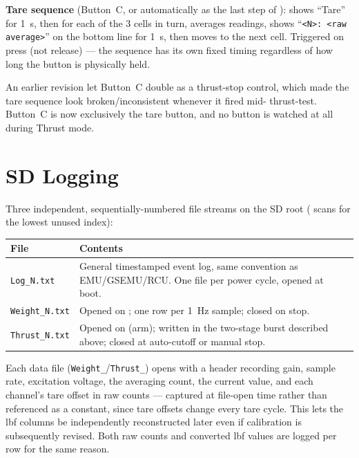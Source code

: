 ﻿\documentclass[11pt,letterpaper]{article}
\begin{document}
\textbf{Tare sequence} (Button~C, or automatically as the last step of
): shows ``Tare'' for 1~s, then for each of the 3 cells in
turn, averages  readings, shows
``\texttt{<N>: <raw average>}'' on the bottom line for 1~s, then moves to
the next cell. Triggered on press (not release) --- the sequence has its
own fixed timing regardless of how long the button is physically held.

\begin{notebox}
An earlier revision let Button~C double as a thrust-stop control, which
made the tare sequence look broken/inconsistent whenever it fired mid-
thrust-test. Button~C is now exclusively the tare button, and no button
is watched at all during Thrust mode.
\end{notebox}

\section{SD Logging}

Three independent, sequentially-numbered file streams on the SD root
( scans for the lowest unused index):

\begin{center}
\begin{tabularx}{\textwidth}{@{}lY@{}}
\toprule
File & Contents \\
\midrule
\texttt{Log\_N.txt}    & General timestamped event log, same convention as EMU/GSEMU/RCU. One file per power cycle, opened at boot. \\
\texttt{Weight\_N.txt} & Opened on ; one row per 1~Hz sample; closed on stop. \\
\texttt{Thrust\_N.txt} & Opened on  (arm); written in the two-stage burst described above; closed at auto-cutoff or manual stop. \\
\bottomrule
\end{tabularx}
\end{center}

Each data file (\texttt{Weight\_}/\texttt{Thrust\_}) opens with a header
recording gain, sample rate, excitation voltage, the averaging count, the
current  value, and each channel's tare
offset in raw counts --- captured at file-open time rather than referenced
as a constant, since tare offsets change every tare cycle. This lets the
lbf columns be independently reconstructed later even if calibration is
subsequently revised. Both raw counts and converted lbf values are logged
per row for the same reason.
\end{document}
